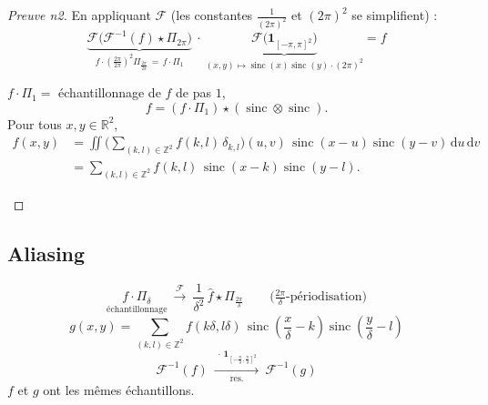 \begin{proof}[Preuve n2]
  En appliquant $\mathcal{F}$ (les constantes $\frac1{(2\pi)^2}$ et $(2\pi)^2$ se simplifient) :
  \[
    \underbrace{\mathcal{F}\big(\mathcal{F}^{-1}(f)\star\Pi_{2\pi}\big)}_{f\cdot\left(\frac{2\pi}{2\pi}\right)^{2}\Pi_{\frac{2\pi}{2\pi}}\,=\,f\cdot\Pi_1}
    \ \cdot\
    \underbrace{\mathcal{F}\big(\mathbf{1}_{[-\pi,\pi]^2}\big)}_{(x,y)\mapsto\operatorname{sinc}(x)\operatorname{sinc}(y)\cdot(2\pi)^2}=f
  \]

  $f\cdot\Pi_1=$ échantillonnage de $f$ de pas $1$,
  \[
    f=(f\cdot\Pi_1)\star(\operatorname{sinc}\otimes\operatorname{sinc}).
  \]
  Pour tous $x,y\in\mathbb{R}^2$,
  \begin{align*}
    f(x,y)&=\iint\Bigg(\sum_{(k,l)\in\mathbb{Z}^2}f(k,l)\,\delta_{k,l}\Bigg)(u,v)\,\operatorname{sinc}(x-u)\operatorname{sinc}(y-v)\,\mathrm{d}u\,\mathrm{d}v\\
    &=\sum_{(k,l)\in\mathbb{Z}^2}f(k,l)\,\operatorname{sinc}(x-k)\operatorname{sinc}(y-l).
  \end{align*}
  \begin{figure}[!h]\centering
    
  \end{figure}
\end{proof}

\subsection{Aliasing}
 
\[
  \underset{\text{échantillonnage}}{f\cdot\Pi_\delta}
  \ \xrightarrow{\ \mathcal{F}\ }\
  \frac1{\delta^{2}}\,\hat f\star\Pi_{\frac{2\pi}\delta}
  \qquad\Big(\tfrac{2\pi}\delta\text{-périodisation}\Big)
\]
\[
  g(x,y)=\sum_{(k,l)\in\mathbb{Z}^2}f(k\delta,l\delta)\,
  \operatorname{sinc}\!\left(\frac x\delta-k\right)\operatorname{sinc}\!\left(\frac y\delta-l\right)
\]
\[
  \mathcal{F}^{-1}(f)\ \xrightarrow[\ \text{res.}\ ]{\ \cdot\,\mathbf{1}_{\left[-\frac\pi\delta,\frac\pi\delta\right]^2}\ }\ \mathcal{F}^{-1}(g)
\]
$f$ et $g$ ont les mêmes échantillons.
 
